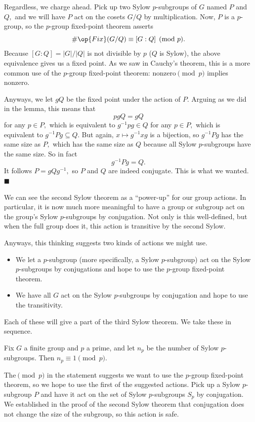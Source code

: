 Regardless, we charge ahead. Pick up two Sylow $p$-subgroups of $G$ named $P$ and $Q,$ and we will have $P$ act on the cosets $G/Q$ by multiplication. Now, $P$ is a $p$-group, so the $p$-group fixed-point theorem asserts
\[\#\op{Fix}(G/Q)\equiv[G:Q]\pmod p.\]
Because $[G:Q]=|G|/|Q|$ is not divisible by $p$ ($Q$ is Sylow), the above equivalence gives us a fixed point. As we saw in Cauchy's theorem, this is a more common use of the $p$-group fixed-point theorem: nonzero$\pmod p$ implies nonzero.

Anyways, we let $gQ$ be the fixed point under the action of $P.$ Arguing as we did in the lemma, this means that
\[pgQ=gQ\]
for any $p\in P,$ which is equivalent to $g^{-1}pg\in Q$ for any $p\in P,$ which is equivalent to $g^{-1}Pg\subseteq Q.$ But again, $x\mapsto g^{-1}xg$ is a bijection, so $g^{-1}Pg$ has the same size as $P,$ which has the same size as $Q$ because all Sylow $p$-subgroups have the same size. So in fact
\[g^{-1}Pg=Q.\]
It follows $P=gQg^{-1},$ so $P$ and $Q$ are indeed conjugate. This is what we wanted. $\blacksquare$

We can see the second Sylow theorem as a ``power-up'' for our group actions. In particular, it is now much more meaningful to have a group or subgroup act on the group's Sylow $p$-subgroups by conjugation. Not only is this well-defined, but when the full group does it, this action is transitive by the second Sylow.

Anyways, this thinking suggests two kinds of actions we might use.
\begin{itemize}
    \item We let a $p$-subgroup (more specifically, a Sylow $p$-subgroup) act on the Sylow $p$-subgroups by conjugations and hope to use the $p$-group fixed-point theorem.
    \item We have all $G$ act on the Sylow $p$-subgroups by conjugation and hope to use the transitivity.
\end{itemize}
Each of these will give a part of the third Sylow theorem. We take these in sequence.
\begin{proposition}
    Fix $G$ a finite group and $p$ a prime, and let $n_p$ be the number of Sylow $p$-subgroups. Then $n_p\equiv1\pmod p.$
\end{proposition}
The$\pmod p$ in the statement suggests we want to use the $p$-group fixed-point theorem, so we hope to use the first of the suggested actions. Pick up a Sylow $p$-subgroup $P$ and have it act on the set of Sylow $p$-subgroups $S_p$ by conjugation. We established in the proof of the second Sylow theorem that conjugation does not change the size of the subgroup, so this action is safe.

